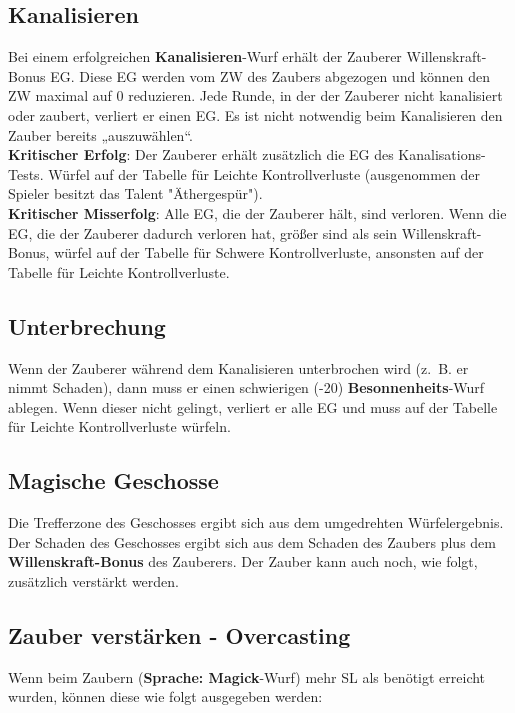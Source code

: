 \documentclass[a4paper,10pt,twoside,twocolumn,openany,nodeprecatedcode,bg=print]{dndbook}
\begin{document}
\subsection{Kanalisieren}
Bei einem erfolgreichen \textbf{Kanalisieren}-Wurf erhält der Zauberer Willenskraft-Bonus EG. Diese EG werden vom ZW des Zaubers abgezogen und können den ZW maximal auf 0 reduzieren.
Jede Runde, in der der Zauberer nicht kanalisiert oder zaubert, verliert er einen EG.
Es ist nicht notwendig beim Kanalisieren den Zauber bereits „auszuwählen“.\\
\textbf{Kritischer Erfolg}: Der Zauberer erhält zusätzlich die EG des Kanalisations-Tests. Würfel auf der Tabelle für Leichte Kontrollverluste (ausgenommen der Spieler besitzt das Talent "Äthergespür").\\
\textbf{Kritischer Misserfolg}: Alle EG, die der Zauberer hält, sind verloren. Wenn die EG, die der Zauberer dadurch verloren hat, größer sind als sein Willenskraft-Bonus, würfel auf der Tabelle für Schwere Kontrollverluste, ansonsten auf der Tabelle für Leichte Kontrollverluste.

\subsection{Unterbrechung}
Wenn der Zauberer während dem Kanalisieren unterbrochen wird (z. B. er nimmt Schaden), dann muss er einen schwierigen (-20) \textbf{Besonnenheits}-Wurf ablegen. Wenn dieser nicht gelingt, verliert er alle EG und muss auf der Tabelle für Leichte Kontrollverluste würfeln.

\subsection{Magische Geschosse}
Die Trefferzone des Geschosses ergibt sich aus dem umgedrehten Würfelergebnis.\\
Der Schaden des Geschosses ergibt sich aus dem Schaden des Zaubers plus dem \textbf{Willenskraft-Bonus} des Zauberers. 
Der Zauber kann auch noch, wie folgt, zusätzlich verstärkt werden.

\subsection{Zauber verstärken - Overcasting}
Wenn beim Zaubern (\textbf{Sprache: Magick}-Wurf) mehr SL als benötigt erreicht wurden, können diese wie folgt ausgegeben werden:
\end{document}
